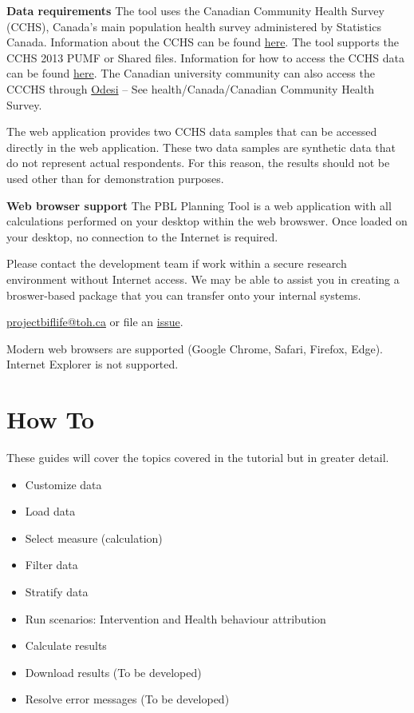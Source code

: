 \documentclass[]{book}
\providecommand{\tightlist}{%
  \setlength{\itemsep}{0pt}\setlength{\parskip}{0pt}}
\begin{document}
\textbf{Data requirements}
The tool uses the Canadian Community Health Survey (CCHS), Canada's main population health survey administered by Statistics Canada. Information about the CCHS can be found \href{http://www23.statcan.gc.ca/imdb/p2SV.pl?Function=getSurvey\&SDDS=3226}{here}. The tool supports the CCHS 2013 PUMF or Shared files. Information for how to access the CCHS data can be found \href{https://www150.statcan.gc.ca/n1/pub/82-620-m/2005001/4144189-eng.htm}{here}. The Canadian university community can also access the CCCHS through \href{http://odesi2.scholarsportal.info/webview/}{Odesi} -- See health/Canada/Canadian Community Health Survey.

The web application provides two CCHS data samples that can be accessed directly in the web application. These two data samples are synthetic data that do not represent actual respondents. For this reason, the results should not be used other than for demonstration purposes.

\textbf{Web browser support}
The PBL Planning Tool is a web application with all calculations performed on your desktop within the web browswer. Once loaded on your desktop, no connection to the Internet is required.

Please contact the development team if work within a secure research environment without Internet access. We may be able to assist you in creating a broswer-based package that you can transfer onto your internal systems.

\href{mailto:projectbiglife.ca}{projectbiflife@toh.ca} or file an \href{https://github.com/Big-Life-Lab/PBL-Planning-Tool-Guidance/issues}{issue}.

Modern web browsers are supported (Google Chrome, Safari, Firefox, Edge). Internet Explorer is not supported.

\hypertarget{howto}{%
\chapter{How To}\label{howto}}

These guides will cover the topics covered in the tutorial but in greater detail.

\begin{itemize}
\tightlist
\item
  Customize data
\item
  Load data
\item
  Select measure (calculation)
\item
  Filter data
\item
  Stratify data
\item
  Run scenarios: Intervention and Health behaviour attribution
\item
  Calculate results
\item
  Download results (To be developed)
\item
  Resolve error messages (To be developed)
\end{itemize}
\end{document}

